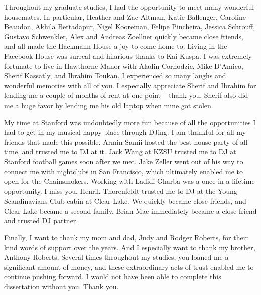 Throughout my graduate studies, I had the opportunity to meet many wonderful housemates.
In particular, Heather and Zac Altman, Katie Ballenger, Caroline Beaudon, Akhila Bettadapur, Nigel Kooreman, Felipe Pincheira, Jessica Schrouff, Gustavo Schwenkler, Alex and Andreas Zoellner quickly became close friends, and all made the Hackmann House a joy to come home to.
Living in the Facebook House was surreal and hilarious thanks to Kai Kuspa.
I was extremely fortunate to live in Hawthorne Manor with  Aladin Corhodzic, Mike D'Amico, Sherif Kassatly, and Ibrahim Toukan.
I experienced so many laughs and wonderful memories with all of you.
I especially appreciate Sherif and Ibrahim for lending me a couple of months of rent at one point -- thank you.
Sherif also did me a huge favor by lending me his old laptop when mine got stolen.

My time at Stanford was undoubtedly more fun because of all the opportunities I had to get in my musical happy place through DJing.
I am thankful for all my friends that made this possible.
Armin Samii hosted the best house party of all time, and trusted me to DJ at it.
Jack Wang at KZSU trusted me to DJ at Stanford football games soon after we met.
Jake Zeller went out of his way to connect me with nightclubs in San Francisco, which ultimately enabled me to open for the Chainsmokers.
Working with Ladidi Gharba was a once-in-a-lifetime opportunity.
I miss you.
Henrik Thorenfeldt trusted me to DJ at the Young Scandinavians Club cabin at Clear Lake.
We quickly became close friends, and Clear Lake became a second family.
Brian Mac immediately became a close friend and trusted DJ partner.

Finally, I want to thank my mom and dad, Judy and Rodger Roberts, for their kind words of support over the years.
And I especially want to thank my brother, Anthony Roberts.
Several times throughout my studies, you loaned me a significant amount of money, and these extraordinary acts of trust enabled me to continue pushing forward.
I would not have been able to complete this dissertation without you.
Thank you.
